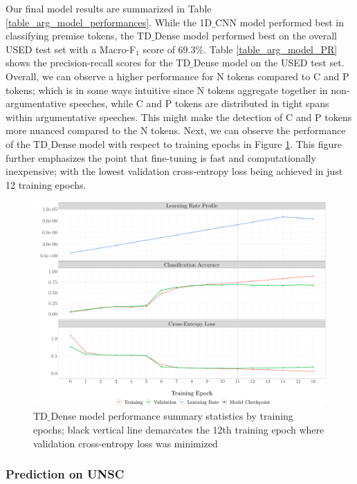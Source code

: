 Our final model results are summarized in Table \ref{table_arg_model_performances}. While the 1D$\_$CNN model performed best in classifying premise tokens, the TD$\_$Dense model performed best on the overall USED test set with a Macro-F$_1$ score of 69.3$\%$. Table \ref{table_arg_model_PR} shows the precision-recall scores for the TD$\_$Dense model on the USED test set. Overall, we can observe a higher performance for N tokens compared to C and P tokens; which is in some ways intuitive since N tokens aggregate together in non-argumentative speeches, while C and P tokens are distributed in tight spans within argumentative speeches. This might make the detection of C and P tokens more nuanced compared to the N tokens. Next, we can observe the performance of the TD$\_$Dense model with respect to training epochs in Figure \ref{model_performance}. This figure further emphasizes the point that fine-tuning is fast and computationally inexpensive; with the lowest validation cross-entropy loss being achieved in just 12 training epochs.

\begin{figure}[t!]
    \centering
    \includegraphics[trim={1.0cm 0cm 0cm 0cm},clip,width=\textwidth]{img/model_training_evolution.pdf}
    \caption{TD$\_$Dense model performance summary statistics by training epochs; black vertical line demarcates the 12th training epoch where validation cross-entropy loss was minimized}
    \label{model_performance}
\end{figure}

\subsubsection{Prediction on UNSC}


